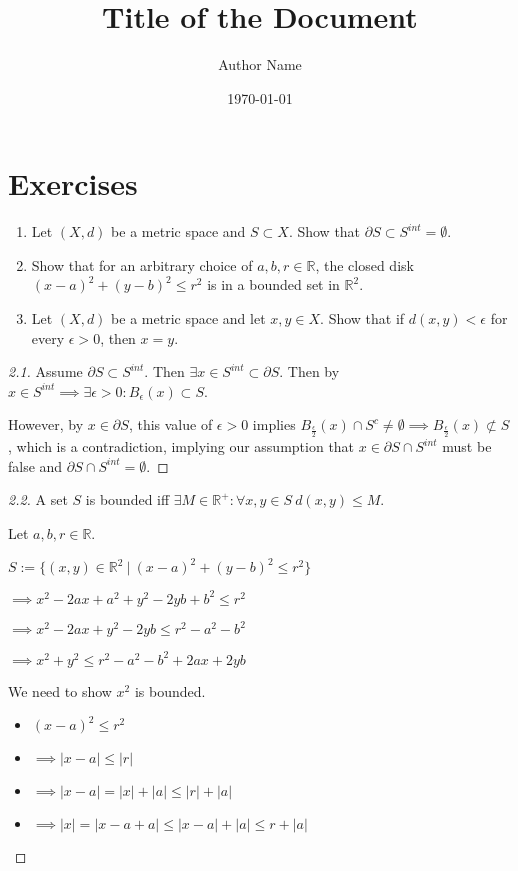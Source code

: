 \documentclass{article}
\title{\textbf{Title of the Document}}
\author{Author Name}
\date{\today}
\theoremstyle{definition}
\numberwithin{equation}{section}
\begin{document}
\maketitle
\tableofcontents
\newpage
\section{Exercises}

\begin{enumerate}
    \item[2.1.] Let $(X, d)$ be a metric space and $S \subset X$. Show that $\partial S \subset S^{int} = \emptyset$.
    \item[2.2.] Show that for an arbitrary choice of $a, b, r \in \mathbb{R}$, the closed disk $(x - a)^2 + (y - b)^2 \leq r^2$ is in a bounded set in $\mathbb{R}^2$.
    \item[2.3.] Let $(X, d)$ be a metric space and let $x, y \in X$. Show that if $d(x, y) < \epsilon$ for every $\epsilon > 0$, then $x = y$.
\end{enumerate}

\begin{proof}[2.1]
Assume $\partial S \subset S^{int}$. Then $\exists x \in S^{int} \subset \partial S$. Then by $x \in S^{int} \implies \exists \epsilon > 0 : B_\epsilon(x) \subset S$.

However, by $x \in \partial S$, this value of $\epsilon > 0$ implies $B_{\frac{\epsilon}{2}}(x) \cap S^c \neq \emptyset \implies B_{\frac{\epsilon}{2}}(x) \not\subset S$, which is a contradiction, implying our assumption that $x \in \partial S \cap S^{int}$ must be false and $\partial S \cap S^{int} = \emptyset$.
\end{proof}

\begin{proof}[2.2]
A set $S$ is bounded iff $\exists M \in \mathbb{R}^+ : \forall x, y \in S \ d(x, y) \leq M$.

Let $a, b, r \in \mathbb{R}$. 

$
S := \{ (x, y) \in \mathbb{R}^2 \ | \ (x - a)^2 + (y - b)^2 \leq r^2 \}
$

$
\implies x^2 - 2ax + a^2 + y^2 - 2yb + b^2 \leq r^2
$

$
\implies x^2 - 2ax + y^2 - 2yb \leq r^2 - a^2 - b^2
$

$
\implies x^2 + y^2 \leq r^2 - a^2 - b^2 + 2ax + 2yb
$

We need to show $x^2$ is bounded. 

\begin{itemize}
    \item $(x - a)^2 \leq r^2$
    \item $\implies |x - a| \leq |r|$
    \item $\implies |x - a| = |x| + |a| \leq |r| + |a|$
    \item $\implies |x| = |x - a + a| \leq |x - a| + |a| \leq r + |a|$
\end{itemize}
\end{proof}
\end{document}
